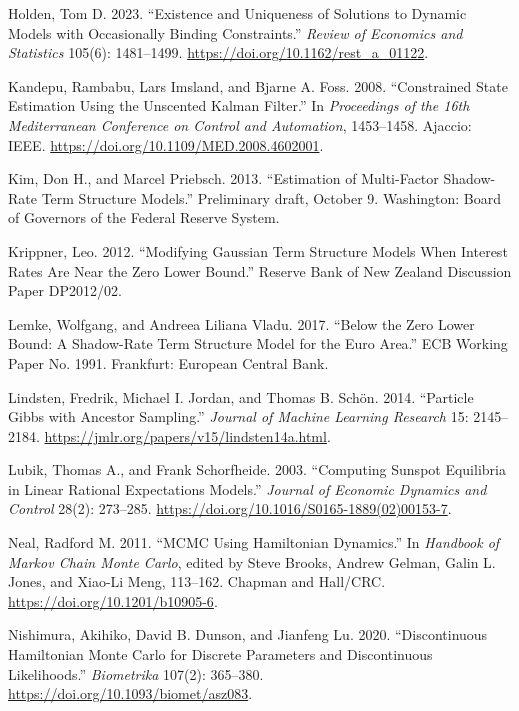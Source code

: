 \documentclass[11pt]{article}
\begin{document}
\begin{list}{}{\setlength{\leftmargin}{2em}\setlength{\itemindent}{-2em}\setlength{\itemsep}{2pt}\setlength{\parsep}{0pt}}
\item Holden, Tom D. 2023. ``Existence and Uniqueness of Solutions to Dynamic Models with Occasionally Binding Constraints.'' \emph{Review of Economics and Statistics} 105(6): 1481--1499. \url{https://doi.org/10.1162/rest_a_01122}.

\item Kandepu, Rambabu, Lars Imsland, and Bjarne A. Foss. 2008. ``Constrained State Estimation Using the Unscented Kalman Filter.'' In \emph{Proceedings of the 16th Mediterranean Conference on Control and Automation}, 1453--1458. Ajaccio: IEEE. \url{https://doi.org/10.1109/MED.2008.4602001}.

\item Kim, Don H., and Marcel Priebsch. 2013. ``Estimation of Multi-Factor Shadow-Rate Term Structure Models.'' Preliminary draft, October 9. Washington: Board of Governors of the Federal Reserve System.

\item Krippner, Leo. 2012. ``Modifying Gaussian Term Structure Models When Interest Rates Are Near the Zero Lower Bound.'' Reserve Bank of New Zealand Discussion Paper DP2012/02.

\item Lemke, Wolfgang, and Andreea Liliana Vladu. 2017. ``Below the Zero Lower Bound: A Shadow-Rate Term Structure Model for the Euro Area.'' ECB Working Paper No. 1991. Frankfurt: European Central Bank.

\item Lindsten, Fredrik, Michael I. Jordan, and Thomas B. Sch\"on. 2014. ``Particle Gibbs with Ancestor Sampling.'' \emph{Journal of Machine Learning Research} 15: 2145--2184. \url{https://jmlr.org/papers/v15/lindsten14a.html}.

\item Lubik, Thomas A., and Frank Schorfheide. 2003. ``Computing Sunspot Equilibria in Linear Rational Expectations Models.'' \emph{Journal of Economic Dynamics and Control} 28(2): 273--285. \url{https://doi.org/10.1016/S0165-1889(02)00153-7}.

\item Neal, Radford M. 2011. ``MCMC Using Hamiltonian Dynamics.'' In \emph{Handbook of Markov Chain Monte Carlo}, edited by Steve Brooks, Andrew Gelman, Galin L. Jones, and Xiao-Li Meng, 113--162. Chapman and Hall/CRC. \url{https://doi.org/10.1201/b10905-6}.

\item Nishimura, Akihiko, David B. Dunson, and Jianfeng Lu. 2020. ``Discontinuous Hamiltonian Monte Carlo for Discrete Parameters and Discontinuous Likelihoods.'' \emph{Biometrika} 107(2): 365--380. \url{https://doi.org/10.1093/biomet/asz083}.


\end{list}
\end{document}
